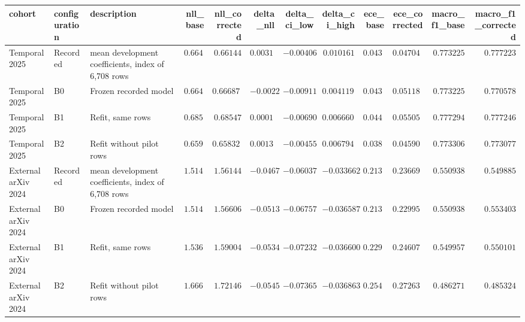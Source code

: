 \begin{tabular}{lllrrrrrrrrr}
\toprule
cohort & configuration & description & nll\_base & nll\_corrected & delta\_nll & delta\_ci\_low & delta\_ci\_high & ece\_base & ece\_corrected & macro\_f1\_base & macro\_f1\_corrected \\
\midrule
Temporal 2025 & Recorded & mean development coefficients, index of 6,708 rows & $0.664585$ & $0.66144$ & $0.00314413$ & $-0.00406316$ & $0.010161$ & $0.0433383$ & $0.0470486$ & $0.773225$ & $0.777223$ \\
Temporal 2025 & B0 & Frozen recorded model & $0.664585$ & $0.666876$ & $-0.0022917$ & $-0.00911134$ & $0.00411949$ & $0.0433383$ & $0.0511895$ & $0.773225$ & $0.770578$ \\
Temporal 2025 & B1 & Refit, same rows & $0.685627$ & $0.68547$ & $0.00015708$ & $-0.00690923$ & $0.0066602$ & $0.0448835$ & $0.0550511$ & $0.777294$ & $0.777246$ \\
Temporal 2025 & B2 & Refit without pilot rows & $0.65968$ & $0.658327$ & $0.00135259$ & $-0.00455836$ & $0.00679454$ & $0.0387823$ & $0.0459041$ & $0.773306$ & $0.773077$ \\
External arXiv 2024 & Recorded & mean development coefficients, index of 6,708 rows & $1.51469$ & $1.56144$ & $-0.0467461$ & $-0.0603754$ & $-0.033662$ & $0.213664$ & $0.236693$ & $0.550938$ & $0.549885$ \\
External arXiv 2024 & B0 & Frozen recorded model & $1.51469$ & $1.56606$ & $-0.0513683$ & $-0.0675797$ & $-0.0365876$ & $0.213664$ & $0.229953$ & $0.550938$ & $0.553403$ \\
External arXiv 2024 & B1 & Refit, same rows & $1.53661$ & $1.59004$ & $-0.0534287$ & $-0.0723283$ & $-0.0366006$ & $0.229514$ & $0.246071$ & $0.549957$ & $0.550101$ \\
External arXiv 2024 & B2 & Refit without pilot rows & $1.66688$ & $1.72146$ & $-0.0545747$ & $-0.0736502$ & $-0.0368638$ & $0.254947$ & $0.272638$ & $0.486271$ & $0.485324$ \\
\bottomrule
\end{tabular}

